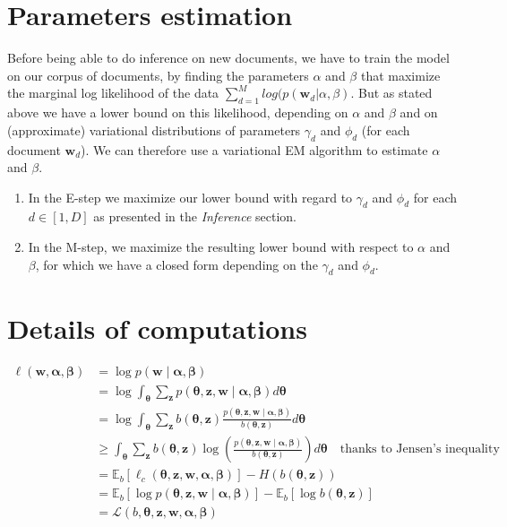 \documentclass[12pt,a4paper,onecolumn]{article}
\begin{document}
\section{Parameters estimation}

Before being able to do inference on new documents, we have to train the model on our corpus of documents, by finding the parameters $\alpha$ and $\beta$ that maximize the marginal log likelihood of the data $\sum_{d=1}^M log(p(\bm{w}_d|\alpha, \beta)$. But as stated above we have a lower bound on this likelihood, depending on $\alpha$ and $\beta$ and on (approximate) variational distributions of parameters $\gamma_d$ and $\phi_d$ (for each document $\bm{w}_d$). We can therefore use a variational EM algorithm to estimate $\alpha$ and $\beta$.
\begin{enumerate}
	\item In the E-step we maximize our lower bound with regard to $\gamma_d$ and $\phi_d$ for each $d\in [1, D]$ as presented in the \textit{Inference} section.
	\item In the M-step, we maximize the resulting lower bound with respect to $\alpha$ and $\beta$, for which we have a closed form depending on the $\gamma_d$ and $\phi_d$.
\end{enumerate}

\section{Details of computations}

\begin{equation}
	\begin{split}
		\ell(\bm{w}, \bm{\alpha}, \bm{\beta}) &= \log p(\bm{w} \mid \bm{\alpha}, \bm{\beta})\\
		&= \log \int_{\bm{\theta}} \sum_{\bm{z}} p(\bm{\theta},\bm{z}, \bm{w} \mid \bm{\alpha}, \bm{\beta}) d\bm{\theta}\\
		&= \log \int_{\bm{\theta}} \sum_{\bm{z}} b(\bm{\theta}, \bm{z}) \frac{p(\bm{\theta},\bm{z}, \bm{w} \mid \bm{\alpha}, \bm{\beta})}{b(\bm{\theta}, \bm{z})} d\bm{\theta}\\
		&\ge \int_{\bm{\theta}} \sum_{\bm{z}} b(\bm{\theta}, \bm{z}) \log \left(\frac{p(\bm{\theta},\bm{z}, \bm{w} \mid \bm{\alpha}, \bm{\beta})}{b(\bm{\theta}, \bm{z})} \right)d\bm{\theta} \quad \text{thanks to Jensen's inequality}\\
		&= \mathbb{E}_{b}\left[\ell_c(\bm{\theta},\bm{z}, \bm{w}, \bm{\alpha}, \bm{\beta})\right] - H(b(\bm{\theta}, \bm{z}))\\
		&= \mathbb{E}_{b}\left[\log p(\bm{\theta},\bm{z}, \bm{w} \mid \bm{\alpha}, \bm{\beta})\right] - \mathbb{E}_{b}\left[\log b(\bm{\theta}, \bm{z})\right]\\
		&= \mathcal{L}(b, \bm{\theta},\bm{z}, \bm{w}, \bm{\alpha}, \bm{\beta})
	\end{split}
\end{equation}
\end{document}
